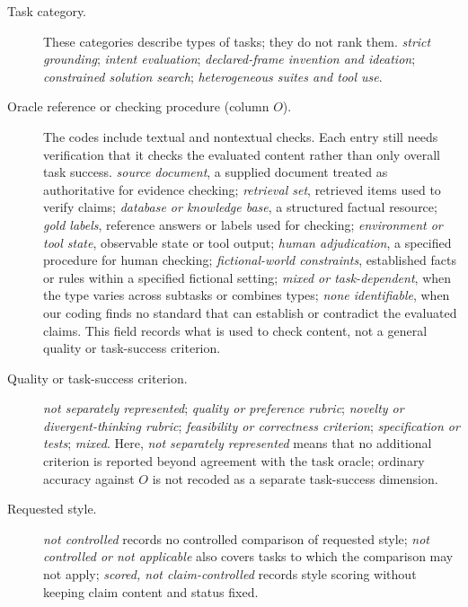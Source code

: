 \documentclass{clv2025}
\begin{document}
\begin{description}
  \item[Task category.]
  These categories describe types of tasks; they do not rank them.
  \emph{strict grounding};
  \emph{intent evaluation};
  \emph{declared-frame invention and ideation};
  \emph{constrained solution search};
  \emph{heterogeneous suites and tool use}.

  \item[Oracle reference or checking procedure (column $O$).]
  The codes include textual and nontextual checks. Each entry still needs
  verification that it checks the evaluated content rather than only overall
  task success.
  \emph{source document}, a supplied document treated as authoritative for
  evidence checking;
  \emph{retrieval set}, retrieved items used to verify claims;
  \emph{database or knowledge base}, a structured factual resource;
  \emph{gold labels}, reference answers or labels used for checking;
  \emph{environment or tool state}, observable state or tool output;
  \emph{human adjudication}, a specified procedure for human checking;
  \emph{fictional-world constraints}, established facts or rules within a
  specified fictional setting;
  \emph{mixed or task-dependent}, when the type varies across subtasks or
  combines types;
  \emph{none identifiable}, when our coding finds no standard that can
  establish or contradict the evaluated claims.
  This field records what is used to check content, not a general quality or
  task-success criterion.

  \item[Quality or task-success criterion.]
  \emph{not separately represented};
  \emph{quality or preference rubric};
  \emph{novelty or divergent-thinking rubric};
  \emph{feasibility or correctness criterion};
  \emph{specification or tests};
  \emph{mixed}.
  Here, \emph{not separately represented} means that no additional criterion
  is reported beyond agreement with the task oracle; ordinary accuracy against
  $O$ is not recoded as a separate task-success dimension.

  \item[Requested style.]
  \emph{not controlled} records no controlled comparison of requested style;
  \emph{not controlled or not applicable} also covers tasks to which the
  comparison may not apply;
  \emph{scored, not claim-controlled} records style scoring without keeping
  claim content and status fixed.


\end{description}
\end{document}
